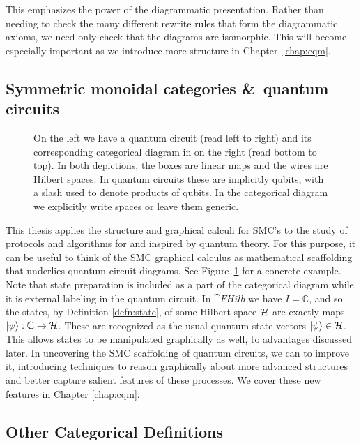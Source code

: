 \noindent This emphasizes the power of the diagrammatic presentation.  Rather than needing to check the many different rewrite rules that form the diagrammatic axioms, we need only check that the diagrams are isomorphic.  This will become especially important as we introduce more structure in Chapter~\ref{chap:cqm}.

\subsection{Symmetric monoidal categories \&\ quantum circuits}
\label{sec:smcqc}
\begin{figure}[t]

\caption[Comparison of quantum circuits and symmetric monoidal diagrams]{On the left we have a quantum circuit (read left to right) and its corresponding categorical diagram in  on the right (read bottom to top). In both depictions, the boxes are linear maps and the wires are Hilbert spaces. In quantum circuits these are implicitly qubits, with a slash used to denote products of qubits. In the categorical diagram we explicitly write spaces or leave them generic.}
\label{fig:QCDSMC}
\end{figure}

This thesis applies the structure and graphical calculi for SMC's to the study of protocols and algorithms for and inspired by quantum theory. For this purpose, it can be useful to think of the SMC graphical calculus as mathematical scaffolding that underlies quantum circuit diagrams. See Figure~\ref{fig:QCDSMC} for a concrete example. Note that state preparation is included as a part of the categorical diagram while it is external labeling in the quantum circuit. In $\cat{FHilb}$ we have $I=\mathbb{C}$, and so the states, by Definition \ref{defn:state}, of some Hilbert space $\mathcal{H}$ are exactly maps $| \psi \rangle:\mathbb{C}\to\mathcal{H}$. These are recognized as the usual quantum state vectors $| \psi \rangle\in\mathcal{H}$. This allows states to be manipulated graphically as well, to advantages discussed later. In uncovering the SMC scaffolding of quantum circuits, we can to improve it, introducing techniques to reason graphically about more advanced structures and better capture salient features of these processes. We cover these new features in Chapter \ref{chap:cqm}.

\subsection{Other Categorical Definitions}

